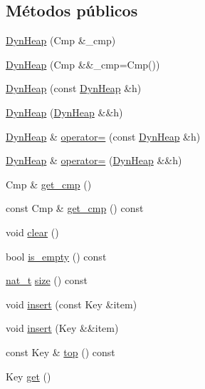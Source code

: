 \subsection*{Métodos públicos}
\begin{DoxyCompactItemize}
\item 
\hyperlink{class_designar_1_1_dyn_heap_a156ccf78397ff8c10a3badf417043a28}{Dyn\+Heap} (Cmp \&\+\_\+cmp)
\item 
\hyperlink{class_designar_1_1_dyn_heap_a0c0805141b81deafa1715d8b77bc1847}{Dyn\+Heap} (Cmp \&\&\+\_\+cmp=Cmp())
\item 
\hyperlink{class_designar_1_1_dyn_heap_ac9570139e90ddd5ef3cd12df8a06739d}{Dyn\+Heap} (const \hyperlink{class_designar_1_1_dyn_heap}{Dyn\+Heap} \&h)
\item 
\hyperlink{class_designar_1_1_dyn_heap_a7bb0017ca6c1f4753f561cd5a7779e97}{Dyn\+Heap} (\hyperlink{class_designar_1_1_dyn_heap}{Dyn\+Heap} \&\&h)
\item 
\hyperlink{class_designar_1_1_dyn_heap}{Dyn\+Heap} \& \hyperlink{class_designar_1_1_dyn_heap_abf024c994d3bf2ccea002640e7c8d528}{operator=} (const \hyperlink{class_designar_1_1_dyn_heap}{Dyn\+Heap} \&h)
\item 
\hyperlink{class_designar_1_1_dyn_heap}{Dyn\+Heap} \& \hyperlink{class_designar_1_1_dyn_heap_a231a0935e2a45fa4d18b94c5b64f1a24}{operator=} (\hyperlink{class_designar_1_1_dyn_heap}{Dyn\+Heap} \&\&h)
\item 
Cmp \& \hyperlink{class_designar_1_1_dyn_heap_a4f1357b3883f314adbd2b7bb100636b3}{get\+\_\+cmp} ()
\item 
const Cmp \& \hyperlink{class_designar_1_1_dyn_heap_a2c5b0b169216b30f44cc26338d3866b1}{get\+\_\+cmp} () const
\item 
void \hyperlink{class_designar_1_1_dyn_heap_a5a1f01a6b4859f9b329df3848561aa3d}{clear} ()
\item 
bool \hyperlink{class_designar_1_1_dyn_heap_a5f067624d97ebe3945adf21cb14af92f}{is\+\_\+empty} () const
\item 
\hyperlink{namespace_designar_aa72662848b9f4815e7bf31a7cf3e33d1}{nat\+\_\+t} \hyperlink{class_designar_1_1_dyn_heap_ab0b3254c032e032d2c7b0d98033fad8e}{size} () const
\item 
void \hyperlink{class_designar_1_1_dyn_heap_aba3a8286ddea8098ab89e18658ec1e3c}{insert} (const Key \&item)
\item 
void \hyperlink{class_designar_1_1_dyn_heap_a28d454d027e576f9fc6f1c888c5e8809}{insert} (Key \&\&item)
\item 
const Key \& \hyperlink{class_designar_1_1_dyn_heap_af6500577f6cfaab1ac768e76a4c43e6c}{top} () const
\item 
Key \hyperlink{class_designar_1_1_dyn_heap_adead89301910d07cf6e019ad35b549ad}{get} ()
\end{DoxyCompactItemize}


